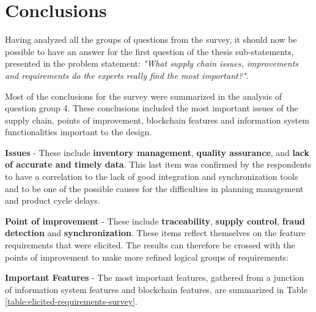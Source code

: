 
\section{Conclusions}


Having analyzed all the groups of questions from the survey, it should now be possible to have an answer for the first question of the thesis sub-statements, presented in the problem statement: \textit{"What supply chain issues, improvements and requirements do the experts really find the most important?"}.

Most of the conclusions for the survey were summarized in the analysis of question group 4. These conclusions included the most important issues of the supply chain, points of improvement, blockchain features and information system functionalities important to the design.


\par \textbf{Issues} - These include \textbf{inventory management}, \textbf{quality assurance}, \textbf{} and \textbf{lack of accurate and timely data}. This last item was confirmed by the respondents to have a correlation to the lack of good integration and synchronization tools and to be one of the possible causes for the difficulties in planning management and product cycle delays.

\par \textbf{Point of improvement} - These include \textbf{traceability}, \textbf{supply control}, \textbf{fraud detection} and \textbf{synchronization}. These items reflect themselves on the feature requirements that were elicited. The results can therefore be crossed with the points of improvement to make more refined logical groups of requirements:

\par \textbf{Important Features} - The most important features, gathered from a junction of information system features and blockchain features, are summarized in Table \ref{table:elicited-requirements-survey}.

